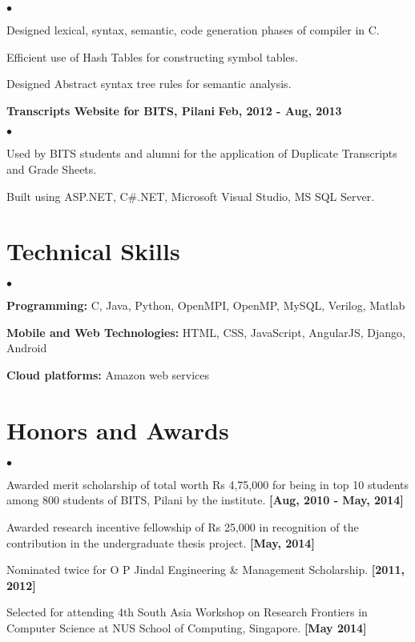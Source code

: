 \documentclass[margin,line]{res}
\newenvironment{list2}{
  \begin{list}{$\bullet$}{%
      \setlength{\itemsep}{0in}
      \setlength{\parsep}{0in} \setlength{\parskip}{0in}
      \setlength{\topsep}{0in} \setlength{\partopsep}{0in} 
      \setlength{\leftmargin}{0.2in}}}{\end{list}}
\begin{document}
\begin{resume}
\vspace{-.3cm}
\begin{list2}
\item Designed lexical, syntax, semantic, code generation phases of compiler in C.
\item Efficient use of Hash Tables for constructing symbol tables.
\item Designed Abstract syntax tree rules for semantic analysis.
\end{list2}

{\bf Transcripts Website for BITS, Pilani} \hfill {\bf Feb, 2012 - Aug, 2013}\\

\vspace{-.3cm}
\begin{list2}
\item Used by BITS students and alumni for the application of Duplicate Transcripts and Grade Sheets.
\item Built using ASP.NET, C\#.NET, Microsoft Visual Studio, MS SQL Server.
\end{list2}




\section{\sc Technical Skills} 
\begin{list2}

\item {\bf Programming:} C, Java, Python, OpenMPI, OpenMP, MySQL, Verilog, Matlab
\item {\bf Mobile and Web Technologies:} HTML, CSS, JavaScript, AngularJS, Django, Android
\item {\bf Cloud platforms:} Amazon web services
\end{list2}
 



\section{\sc Honors and Awards}
\begin{list2}
\item Awarded merit scholarship of total worth Rs 4,75,000 for being in top 10 students among 800 students of BITS, Pilani by the institute. {\bf [Aug, 2010 - May, 2014]}

\item Awarded research incentive fellowship of Rs 25,000 in recognition of the contribution in the
undergraduate thesis project. {\bf [May, 2014]}

\item Nominated twice for O P Jindal Engineering \& Management Scholarship. {\bf [2011, 2012]}

\item Selected for attending 4th South Asia Workshop on Research Frontiers in Computer Science at
NUS School of Computing, Singapore. {\bf [May 2014]}
\end{list2}

\end{resume}
\end{document}
